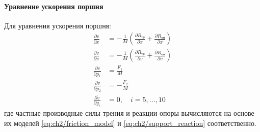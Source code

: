 \paragraph{Уравнение ускорения поршня}
Для уравнения ускорения поршня:
\begin{equation}\label{eq:ch2/jacobian_acceleration}
    \begin{aligned}
        \frac{\partial \dot{v}}{\partial x}   & = -\frac{1}{M}\left(\frac{\partial R_\text{тр}}{\partial x} + \frac{\partial R_\text{оп}}{\partial x}\right) \\
        \frac{\partial \dot{v}}{\partial v}   & = -\frac{1}{M}\left(\frac{\partial R_\text{тр}}{\partial v} + \frac{\partial R_\text{оп}}{\partial v}\right) \\
        \frac{\partial \dot{v}}{\partial p_1} & = \frac{F_1}{M}                                                                                              \\
        \frac{\partial \dot{v}}{\partial p_2} & = -\frac{F_2}{M}                                                                                             \\
        \frac{\partial \dot{v}}{\partial y_i} & = 0, \quad i = 5, \ldots, 10
    \end{aligned}
\end{equation}
где частные производные силы трения и реакции опоры вычисляются на основе их моделей \eqref{eq:ch2/friction_model} и \eqref{eq:ch2/support_reaction} соответственно.

